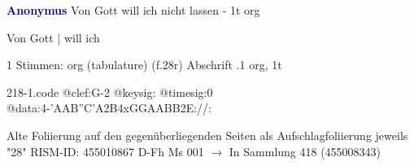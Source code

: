 \documentclass[twocolumn]{book}
\begin{document}
\newline \par \vspace{7pt} \textcolor{darkblue}{\textbf{Anonymus  }}
\newline Von Gott will ich nicht lassen - 1t
\newline org
\newline \begin{itshape}[f.28r, at left:] Von Gott | will ich\end{itshape} 
\newline \textcolor{darkblue}{}  1 Stimmen: org (tabulature)  (f.28r)
\newline Abschrift
.1  org, 1t  
\begin{filecontents*}{218-1.code}
@clef:G-2
@keysig:
@timesig:0
@data:4-'AAB''C'A2B4xGGAABB2E://:
\end{filecontents*}
\newline
%
\newline Alte Foliierung auf den gegenüberliegenden Seiten als Aufschlagfoliierung jeweils "28"
\newline RISM-ID: 455010867
\newline D-Fh  Ms 001
\newline $\rightarrow$ In Sammlung 418 (455008343)
      
\end{document}
